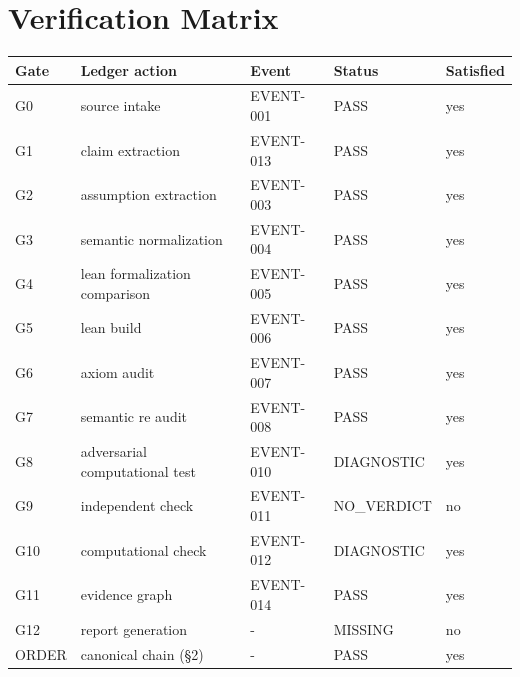 \documentclass[11pt]{article}
\begin{document}
\section{Verification Matrix}
\begin{longtable}{lllll}
\toprule Gate & Ledger action & Event & Status & Satisfied \\ \midrule \endhead
G0 & source intake & EVENT-001 & PASS & yes \\
G1 & claim extraction & EVENT-013 & PASS & yes \\
G2 & assumption extraction & EVENT-003 & PASS & yes \\
G3 & semantic normalization & EVENT-004 & PASS & yes \\
G4 & lean formalization comparison & EVENT-005 & PASS & yes \\
G5 & lean build & EVENT-006 & PASS & yes \\
G6 & axiom audit & EVENT-007 & PASS & yes \\
G7 & semantic re audit & EVENT-008 & PASS & yes \\
G8 & adversarial computational test & EVENT-010 & DIAGNOSTIC & yes \\
G9 & independent check & EVENT-011 & NO\_VERDICT & no \\
G10 & computational check & EVENT-012 & DIAGNOSTIC & yes \\
G11 & evidence graph & EVENT-014 & PASS & yes \\
G12 & report generation & - & MISSING & no \\
ORDER & canonical chain (\S{}2) & - & PASS & yes \\
\bottomrule
\end{longtable}
\end{document}
